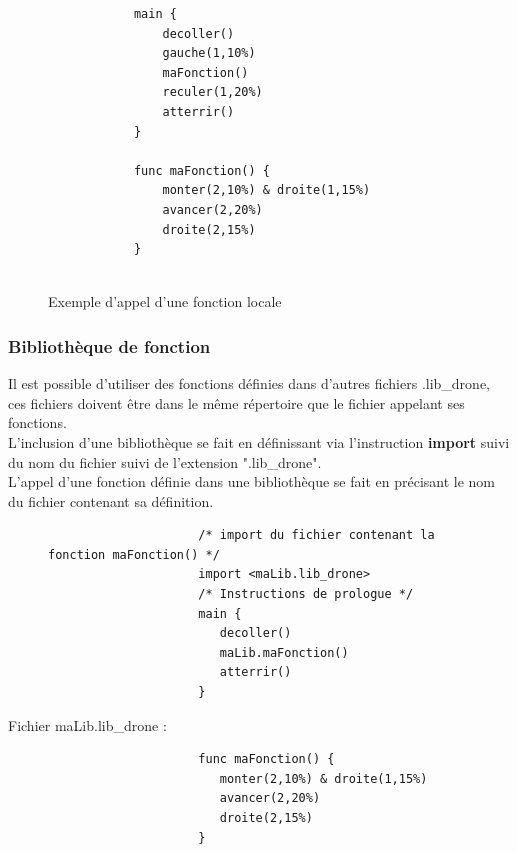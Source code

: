 \documentclass[12pt]{article}
\begin{document}
    \begin{figure}[h!]
        \begin{center}
            \begin{verbatim}
            main {
                decoller()
                gauche(1,10%)
                maFonction()
                reculer(1,20%)
                atterrir()
            }
                
            func maFonction() {
                monter(2,10%) & droite(1,15%)
                avancer(2,20%)
                droite(2,15%)
            }
            
            \end{verbatim}
        \end{center}
        \caption{Exemple d'appel d'une fonction locale}
        \label{Exemple d'appel d'une fonction locale}
    \end{figure}

	
	\subsubsection{Bibliothèque de fonction}

	Il est possible d'utiliser des fonctions définies dans d'autres fichiers .lib\_drone, ces fichiers doivent être dans le même répertoire que le fichier appelant ses fonctions.\\
	L'inclusion d'une bibliothèque se fait en définissant via l'instruction \textbf{import} suivi du nom du fichier suivi de l'extension ".lib\_drone".\\
	L'appel d'une fonction définie dans une bibliothèque se fait en précisant le nom du fichier contenant sa définition.\\
	
	  \begin{figure}[h!]
       		 \begin{center}
        		    \begin{verbatim}
		             /* import du fichier contenant la fonction maFonction() */
		             import <maLib.lib_drone>	
		             /* Instructions de prologue */
		             main {
		                decoller()
		                maLib.maFonction()
		                atterrir()
		             }
        		    \end{verbatim}
        		\end{center}
   	 \end{figure}
	
	Fichier maLib.lib\_drone : \\
   	\begin{figure}[h!]
       		 \begin{center}
            		\begin{verbatim}
		             func maFonction() {
		                monter(2,10%) & droite(1,15%)
		                avancer(2,20%)
		                droite(2,15%)
		             }
           		 \end{verbatim}
        		\end{center}
   	 \end{figure}
  
	
        
\end{document}
